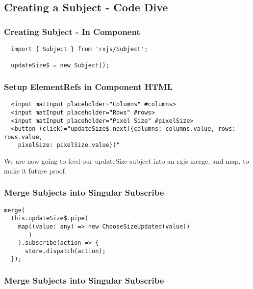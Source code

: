 \subsection{ Creating a Subject - Code Dive }

\subsubsection{ Creating Subject - In Component }
\begin{lstlisting}
  import { Subject } from 'rxjs/Subject';

  updateSize$ = new Subject();
\end{lstlisting}

\subsubsection{ Setup ElementRefs in Component HTML }
\begin{verbatim}
  <input matInput placeholder="Columns" #columns>
  <input matInput placeholder="Rows" #rows>
  <input matInput placeholder="Pixel Size" #pixelSize>
  <button (click)="updateSize$.next({columns: columns.value, rows: rows.value,
    pixelSize: pixelSize.value})"
\end{verbatim}

We are now going to feed our updateSize subject into an rxjs merge, and map,
to make it future proof.

\subsubsection{ Merge Subjects into Singular Subscribe }

\begin{lstlisting}
merge(
  this.updateSize$.pipe(
    map((value: any) => new ChooseSizeUpdated(value))
       )
    ).subscribe(action => {
      store.dispatch(action);
  });
\end{lstlisting}

\subsubsection{ Merge Subjects into Singular Subscribe }
